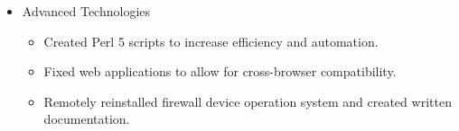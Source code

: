 \begin{cvparagraph}
\begin{itemize}
   \item Advanced Technologies
   \begin{itemize}
      \item Created Perl 5 scripts to increase efficiency and automation.
      \item Fixed web applications to allow for cross-browser compatibility.
      \item Remotely reinstalled firewall device operation system and created 
         written documentation.
   \end{itemize}
   
\end{itemize}

\end{cvparagraph}
